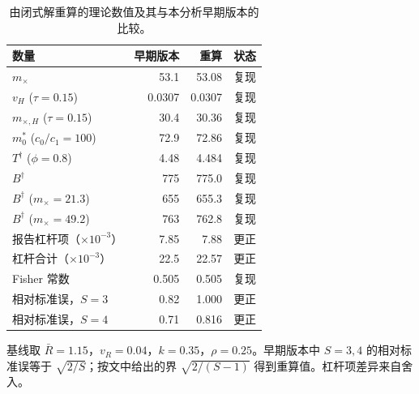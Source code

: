 \begin{table}[htbp]
\centering
\footnotesize
\caption{由闭式解重算的理论数值及其与本分析早期版本的比较。}
\label{tab:s7}
\begin{tabular}{lrrl}
\toprule
数量 & 早期版本 & 重算 & 状态 \\
\midrule
$m_\times$ & 53.1 & 53.08 & 复现 \\
$v_H$ ($\tau=0.15$) & 0.0307 & 0.0307 & 复现 \\
$m_{\times,H}$ ($\tau=0.15$) & 30.4 & 30.36 & 复现 \\
$m_0^*$ ($c_0/c_1=100$) & 72.9 & 72.86 & 复现 \\
$T^\dagger$ ($\phi=0.8$) & 4.48 & 4.484 & 复现 \\
$B^\dagger$ & 775 & 775.0 & 复现 \\
$B^\dagger$ ($m_\times=21.3$) & 655 & 655.3 & 复现 \\
$B^\dagger$ ($m_\times=49.2$) & 763 & 762.8 & 复现 \\
报告杠杆项（$\times10^{-3}$） & 7.85 & 7.88 & 更正 \\
杠杆合计（$\times10^{-3}$） & 22.5 & 22.57 & 更正 \\
Fisher 常数 & 0.505 & 0.505 & 复现 \\
相对标准误，$S=3$ & 0.82 & 1.000 & 更正 \\
相对标准误，$S=4$ & 0.71 & 0.816 & 更正 \\
\bottomrule
\end{tabular}
\par\smallskip
\begin{minipage}{0.95\linewidth}\scriptsize 基线取 $\bar{R}=1.15$，$v_R=0.04$，$k=0.35$，$\rho=0.25$。早期版本中 $S=3,4$ 的相对标准误等于 $\sqrt{2/S}$；按文中给出的界 $\sqrt{2/(S-1)}$ 得到重算值。杠杆项差异来自舍入。\end{minipage}
\end{table}
